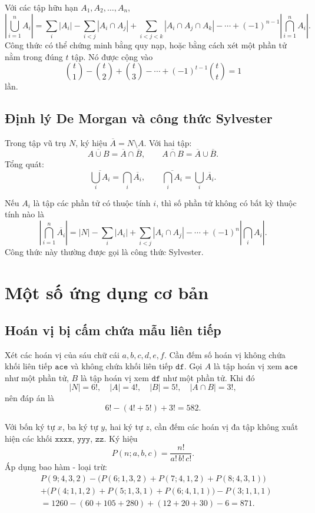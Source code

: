 \documentclass[11pt]{article}
\newcommand{\C}[2]{\binom{#1}{#2}}
\newcommand{\card}[1]{\left|#1\right|}
\begin{document}
Với các tập hữu hạn \(A_1,A_2,\ldots,A_n\),
\[
  \card{\bigcup_{i=1}^n A_i}
  =
  \sum_i \card{A_i}
  -\sum_{i<j}\card{A_i\cap A_j}
  +\sum_{i<j<k}\card{A_i\cap A_j\cap A_k}
  -\cdots
  +(-1)^{n-1}\card{\bigcap_{i=1}^n A_i}.
\]
Công thức có thể chứng minh bằng quy nạp, hoặc bằng cách xét một phần tử nằm
trong đúng \(t\) tập. Nó được cộng vào
\[
  \C t1-\C t2+\C t3-\cdots+(-1)^{t-1}\C tt=1
\]
lần.

\subsection{Định lý De Morgan và công thức Sylvester}

Trong tập vũ trụ \(N\), ký hiệu \(\overline A=N\setminus A\). Với hai tập:
\[
  \overline{A\cup B}=\overline A\cap\overline B,\qquad
  \overline{A\cap B}=\overline A\cup\overline B.
\]
Tổng quát:
\[
  \overline{\bigcup_i A_i}=\bigcap_i\overline{A_i},\qquad
  \overline{\bigcap_i A_i}=\bigcup_i\overline{A_i}.
\]

Nếu \(A_i\) là tập các phần tử có thuộc tính \(i\), thì số phần tử không có
bất kỳ thuộc tính nào là
\[
  \card{\bigcap_{i=1}^n \overline{A_i}}
  =
  \card N-\sum_i\card{A_i}
  +\sum_{i<j}\card{A_i\cap A_j}
  -\cdots
  +(-1)^n\card{\bigcap_i A_i}.
\]
Công thức này thường được gọi là công thức Sylvester.

\section{Một số ứng dụng cơ bản}

\subsection{Hoán vị bị cấm chứa mẫu liên tiếp}

Xét các hoán vị của sáu chữ cái \(a,b,c,d,e,f\). Cần đếm số hoán vị không
chứa khối liên tiếp \(\texttt{ace}\) và không chứa khối liên tiếp
\(\texttt{df}\). Gọi \(A\) là tập hoán vị xem \(\texttt{ace}\) như một phần
tử, \(B\) là tập hoán vị xem \(\texttt{df}\) như một phần tử. Khi đó
\[
  \card N=6!,\quad \card A=4!,\quad \card B=5!,\quad
  \card{A\cap B}=3!,
\]
nên đáp án là
\[
  6!-(4!+5!)+3!=582.
\]

Với bốn ký tự \(x\), ba ký tự \(y\), hai ký tự \(z\), cần đếm các hoán vị đa
tập không xuất hiện các khối \(\texttt{xxxx}\), \(\texttt{yyy}\),
\(\texttt{zz}\). Ký hiệu
\[
  P(n;a,b,c)=\frac{n!}{a!\,b!\,c!}.
\]
Áp dụng bao hàm - loại trừ:
\[
\begin{aligned}
&P(9;4,3,2)
-\bigl(P(6;1,3,2)+P(7;4,1,2)+P(8;4,3,1)\bigr)\\
&+\bigl(P(4;1,1,2)+P(5;1,3,1)+P(6;4,1,1)\bigr)
-P(3;1,1,1)\\
&=1260-(60+105+280)+(12+20+30)-6=871.
\end{aligned}
\]
\end{document}
